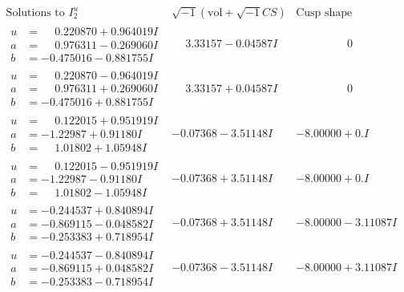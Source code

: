 \documentclass[1p]{elsarticle_modified}
\theoremstyle{definition}
\newcommand{\I}{\sqrt{-1}}
\begin{document}
$$\begin{array}{c|c|c}  
\text{Solutions to }I^u_{2}& \I (\text{vol} + \sqrt{-1}CS) & \text{Cusp shape}\\
 \hline 
\begin{aligned}
u &= \phantom{-}0.220870 + 0.964019 I \\
a &= \phantom{-}0.976311 - 0.269060 I \\
b &= -0.475016 - 0.881755 I\end{aligned}
 & \phantom{-}3.33157 - 0.04587 I & \phantom{-0.000000 } 0 \\ \hline\begin{aligned}
u &= \phantom{-}0.220870 - 0.964019 I \\
a &= \phantom{-}0.976311 + 0.269060 I \\
b &= -0.475016 + 0.881755 I\end{aligned}
 & \phantom{-}3.33157 + 0.04587 I & \phantom{-0.000000 } 0 \\ \hline\begin{aligned}
u &= \phantom{-}0.122015 + 0.951919 I \\
a &= -1.22987 + 0.91180 I \\
b &= \phantom{-}1.01802 + 1.05948 I\end{aligned}
 & -0.07368 - 3.51148 I & -8.00000 + 0. I\phantom{ +0.000000I} \\ \hline\begin{aligned}
u &= \phantom{-}0.122015 - 0.951919 I \\
a &= -1.22987 - 0.91180 I \\
b &= \phantom{-}1.01802 - 1.05948 I\end{aligned}
 & -0.07368 + 3.51148 I & -8.00000 + 0. I\phantom{ +0.000000I} \\ \hline\begin{aligned}
u &= -0.244537 + 0.840894 I \\
a &= -0.869115 - 0.048582 I \\
b &= -0.253383 + 0.718954 I\end{aligned}
 & -0.07368 + 3.51148 I & -8.00000 - 3.11087 I \\ \hline\begin{aligned}
u &= -0.244537 - 0.840894 I \\
a &= -0.869115 + 0.048582 I \\
b &= -0.253383 - 0.718954 I\end{aligned}
 & -0.07368 - 3.51148 I & -8.00000 + 3.11087 I \\ \hline\begin{aligned}

\end{aligned}
\end{array}$$
\end{document}
